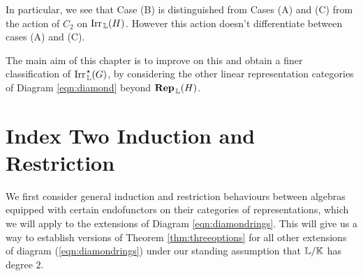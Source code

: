 In particular, we see that Case (B) is distinguished from Cases (A) and (C) from the action of $C_2$ on $\operatorname{Irr}_{\, {\mathbb L}}(H)$. However this action doesn't differentiate between cases (A) and (C).

The main aim of this chapter is to improve on this and obtain a finer classification of $\operatorname{Irr}_{\, {\mathbb L}}^{\hspace{0.1em} \star}(G)$, by considering the other linear representation categories of Diagram \eqref{eqn:diamond} beyond $\operatorname{\mathbf{Rep}}_{\, {\mathbb L}}(H)$.

\section{Index Two Induction and Restriction}\label{sect:fourfoldway}

We first consider general induction and restriction behaviours between algebras equipped with certain endofunctors on their categories of representations, which we will apply to the extensions of Diagram \eqref{eqn:diamondrings}. This will give us a way to establish versions of Theorem \ref{thm:threeoptions} for all other extensions of diagram (\ref{eqn:diamondrings}) under our standing assumption that ${\mathbb L} / {\mathbb K}$ has degree $2$.

